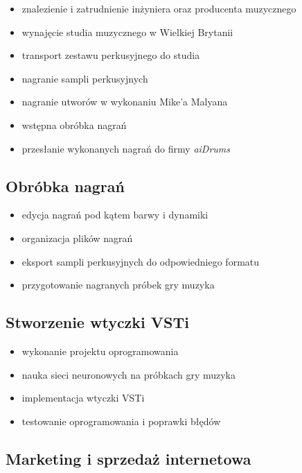 \documentclass[12pt]{article}
\newcommand{\nazwafirmy}{aiDrums\xspace}
\begin{document}
\begin{itemize}
    \item znalezienie i zatrudnienie inżyniera oraz producenta muzycznego
    \item wynajęcie studia muzycznego w Wielkiej Brytanii
    \item transport zestawu perkusyjnego do studia
    \item nagranie sampli perkusyjnych
    \item nagranie utworów w wykonaniu Mike'a Malyana
    \item wstępna obróbka nagrań
    \item przesłanie wykonanych nagrań do firmy \textit{\nazwafirmy}
\end{itemize}

\subsection{Obróbka nagrań}

\begin{itemize}
    \item edycja nagrań pod kątem barwy i dynamiki
    \item organizacja plików nagrań
    \item eksport sampli perkusyjnych do odpowiedniego formatu
    \item przygotowanie nagranych próbek gry muzyka
\end{itemize}

\subsection{Stworzenie wtyczki VSTi}

\begin{itemize}
    \item wykonanie projektu oprogramowania
    \item nauka sieci neuronowych na próbkach gry muzyka
    \item implementacja wtyczki VSTi
    \item testowanie oprogramowania i poprawki błędów
\end{itemize}

\subsection{Marketing i sprzedaż internetowa}
\end{document}
